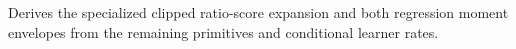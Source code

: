 Derives the specialized clipped ratio-score expansion and both regression moment envelopes from the remaining primitives and conditional learner rates.